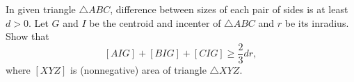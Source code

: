 In given triangle $\triangle ABC$, difference between sizes of each pair of sides is at least $d>0$. Let $G$ and $I$ be the centroid and incenter of $\triangle ABC$ and $r$ be its inradius. Show that $$[AIG]+[BIG]+[CIG]\ge\frac{2}{3}dr,$$ where $[XYZ]$ is (nonnegative) area of triangle $\triangle XYZ$.